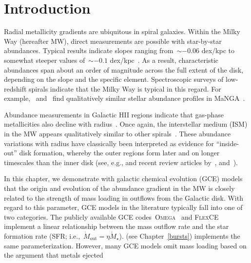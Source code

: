 \section{Introduction}
\label{outflows:sec:intro}
Radial metallicity gradients are ubiquitous in spiral galaxies.
Within the Milky Way (hereafter MW), direct measurements are possible with
star-by-star abundances.
Typical results indicate slopes ranging from~$\sim$$-0.06$ dex/kpc to somewhat
steeper values of~$\sim$$-0.1$ dex/kpc~\citep[e.g.,][]{Nordstroem2004,
Cheng2012, Frinchaboy2013, Hayden2014, Weinberg2019, Myers2022}.
As a result, characteristic abundances span about an order of magnitude across
the full extent of the disk, depending on the slope and the specific element.
Spectroscopic surveys of low-redshift spirals indicate that the Milky Way is
typical in this regard.
For example,~\citet{Goddard2017} and~\citet{Parikh2021} find qualitatively
similar stellar abundance profiles in MaNGA~\citep{Bundy2015}.
\par
Abundance measurements in Galactic HII regions indicate that gas-phase
metallicities also decline with radius~\citep[e.g.,][]{Simpson1995,
Afflerbach1997, Esteban2022, MendezDelgado2022, MendezDelgado2023}.
Once again, the interstellar medium (ISM) in the MW appears qualitatively
similar to other spirals~\citep[e.g.,][]{Belfiore2017, Berg2020,
Franchetto2021, Lutz2021, Boardman2022}.
These abundance variations with radius have classically been interpreted as
evidence for ``inside-out'' disk formation, whereby the outer regions form
later and on longer timescales than the inner disk (see, e.g.,
\citealt{Kauffmann1996} and recent review articles by~\citealt{Kewley2019,
Maiolino2019}, and~\citealt{Sanchez2020}).
\par
In this chapter, we demonstrate with galactic chemical evolution (GCE) models
that the origin and evolution of the abundance gradient in the MW is closely
related to the strength of mass loading in outflows from the Galactic disk.
With regard to this parameter, GCE models in the literature typically fall into
one of two categories.
The publicly available GCE codes~\textsc{Omega}~\citep{Cote2017} and
\textsc{FlexCE}~\citep{Andrews2017} implement a linear relationship between the
mass outflow rate and the star formation rate (SFR;
i.e.,~$\dot{M}_\text{out} = \eta \dot{M}_\star$).
\vice\space(see Chapter~\ref{bursts}) implements the same parameterization.
However, many GCE models omit mass loading
\citep[i.e.,~$\eta = 0$; e.g.,][]{Minchev2013, Minchev2014, Spitoni2019,
Spitoni2020, Spitoni2021, Gjergo2023} based on the argument that metals ejected
